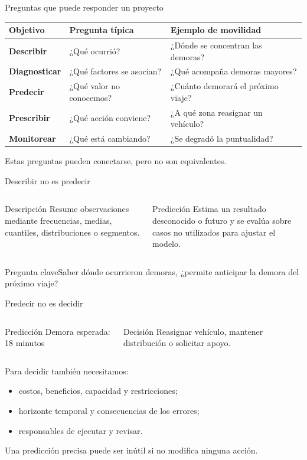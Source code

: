 \documentclass[aspectratio=169,11pt]{beamer}
\newcommand{\pregunta}[1]{\begin{block}{Pregunta clave}#1\end{block}}
\begin{document}
\begin{frame}{Preguntas que puede responder un proyecto}
  \small
  \begin{tabularx}{\textwidth}{>{\bfseries}p{} X X}
    \toprule
    Objetivo & Pregunta típica & Ejemplo de movilidad \\
    \midrule
    Describir & ¿Qué ocurrió? & ¿Dónde se concentran las demoras? \\
    Diagnosticar & ¿Qué factores se asocian? & ¿Qué acompaña demoras mayores? \\
    Predecir & ¿Qué valor no conocemos? & ¿Cuánto demorará el próximo viaje? \\
    Prescribir & ¿Qué acción conviene? & ¿A qué zona reasignar un vehículo? \\
    Monitorear & ¿Qué está cambiando? & ¿Se degradó la puntualidad? \\
    \bottomrule
  \end{tabularx}
  \vfill
  \centering\alert{Estas preguntas pueden conectarse, pero no son equivalentes.}
\end{frame}

\begin{frame}{Describir no es predecir}
  \begin{columns}[T]
      \begin{block}{Descripción}
        Resume observaciones mediante frecuencias, medias, cuantiles, distribuciones o segmentos.
      \end{block}
      \begin{block}{Predicción}
        Estima un resultado desconocido o futuro y se evalúa sobre casos no utilizados para ajustar el modelo.
      \end{block}
  \end{columns}
  \vfill
  \pregunta{Saber dónde ocurrieron demoras, ¿permite anticipar la demora del próximo viaje?}
\end{frame}

\begin{frame}{Predecir no es decidir}
  \begin{columns}[T]
      \begin{block}{Predicción}
        \centering\large Demora esperada: 18 minutos
      \end{block}
      \begin{block}{Decisión}
        Reasignar vehículo, mantener distribución o solicitar apoyo.
      \end{block}
  \end{columns}
  \vspace{0.5em}
  Para decidir también necesitamos:
  \begin{itemize}
    \item costos, beneficios, capacidad y restricciones;
    \item horizonte temporal y consecuencias de los errores;
    \item responsables de ejecutar y revisar.
  \end{itemize}
  \centering\alert{Una predicción precisa puede ser inútil si no modifica ninguna acción.}
\end{frame}
\end{document}
